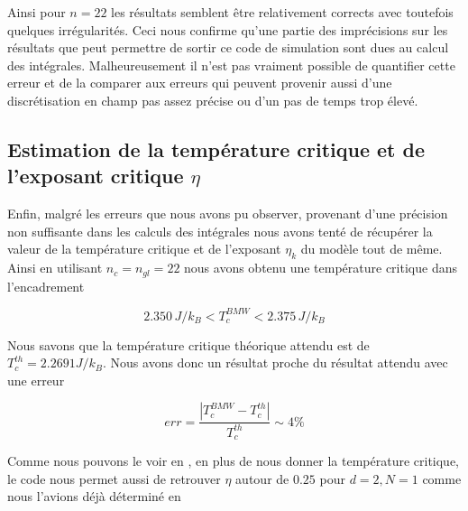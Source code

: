 \documentclass[10.5pt]{article}
\begin{document}
\begin{multicols}{2}
Ainsi pour $n=22$ les résultats semblent être relativement corrects avec toutefois quelques irrégularités. Ceci nous confirme qu'une partie des imprécisions sur les résultats que peut permettre de sortir ce code de simulation sont dues au calcul des intégrales. Malheureusement il n'est pas vraiment possible de quantifier cette erreur et de la comparer aux erreurs qui peuvent provenir aussi d'une discrétisation en champ pas assez précise ou d'un pas de temps trop élevé. \\



\subsection{Estimation de la température critique et de l'exposant critique $\eta$}

Enfin, malgré les erreurs que nous avons pu observer, provenant d'une précision non suffisante dans les calculs des intégrales nous avons tenté de récupérer la valeur de la température critique et de l'exposant $\eta_k$ du modèle tout de même. Ainsi en utilisant $n_c = n_{gl} = 22$ nous avons obtenu une température critique dans l'encadrement

\begin{equation}
2.350 \, J/k_B < T_c^{BMW}  < 2.375 \, J/k_B
\end{equation}

Nous savons que la température critique théorique attendu est de $T_c^{th} = 2.2691 J/k_B$. Nous avons donc un résultat proche du résultat attendu avec une erreur 

\begin{equation}
	err = \frac{ |T_c^{BMW} - T_c^{th}|}{T_c^{th}} \sim 4 \%
\end{equation}


Comme nous pouvons le voir en , en plus de nous donner la température critique, le code nous permet aussi de retrouver $\eta$ autour de $0.25$ pour $d=2, N=1$ comme nous l'avions déjà déterminé en 


\end{multicols}
\end{document}
